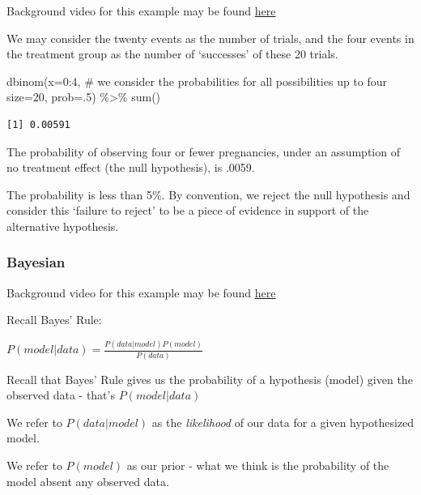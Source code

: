 \documentclass[
  letterpaper,
  DIV=11,
  numbers=noendperiod,
  oneside]{scrartcl}
\newenvironment{Shaded}{\begin{snugshade}}{\end{snugshade}}
\newcommand{\AttributeTok}[1]{\textcolor[rgb]{0.40,0.45,0.13}{#1}}
\newcommand{\CommentTok}[1]{\textcolor[rgb]{0.37,0.37,0.37}{#1}}
\newcommand{\DecValTok}[1]{\textcolor[rgb]{0.68,0.00,0.00}{#1}}
\newcommand{\FunctionTok}[1]{\textcolor[rgb]{0.28,0.35,0.67}{#1}}
\newcommand{\NormalTok}[1]{\textcolor[rgb]{0.00,0.23,0.31}{#1}}
\newcommand{\SpecialCharTok}[1]{\textcolor[rgb]{0.37,0.37,0.37}{#1}}
\begin{document}
Background video for this example may be found
\href{https://www.coursera.org/learn/bayesian/lecture/fVGe0/inference-for-a-proportion-frequentist-approach}{here}

We may consider the twenty events as the number of trials, and the four
events in the treatment group as the number of `successes' of these 20
trials.

\begin{Shaded}
\begin{Highlighting}[]
\FunctionTok{dbinom}\NormalTok{(}\AttributeTok{x=}\DecValTok{0}\SpecialCharTok{:}\DecValTok{4}\NormalTok{, }\CommentTok{\# we consider the probabilities for all possibilities up to four }
       \AttributeTok{size=}\DecValTok{20}\NormalTok{, }
       \AttributeTok{prob=}\NormalTok{.}\DecValTok{5}\NormalTok{) }\SpecialCharTok{\%\textgreater{}\%}
  \FunctionTok{sum}\NormalTok{()}
\end{Highlighting}
\end{Shaded}

\begin{verbatim}
[1] 0.00591
\end{verbatim}

The probability of observing four or fewer pregnancies, under an
assumption of no treatment effect (the null hypothesis), is .0059.

The probability is less than 5\%. By convention, we reject the null
hypothesis and consider this `failure to reject' to be a piece of
evidence in support of the alternative hypothesis.

\hypertarget{bayesian}{%
\subsubsection{Bayesian}\label{bayesian}}

Background video for this example may be found
\href{https://www.coursera.org/learn/bayesian/lecture/cOdqz/inference-for-a-proportion-bayesian-approach}{here}

Recall Bayes' Rule:

\(P(model|data)=\frac{P(data|model)P(model)}{P(data)}\)

Recall that Bayes' Rule gives us the probability of a hypothesis (model)
given the observed data - that's \(P(model|data)\)

We refer to \(P(data|model)\) as the \emph{likelihood} of our data for a
given hypothesized model.

We refer to \(P(model)\) as our prior - what we think is the probability
of the model absent any observed data.
\end{document}
